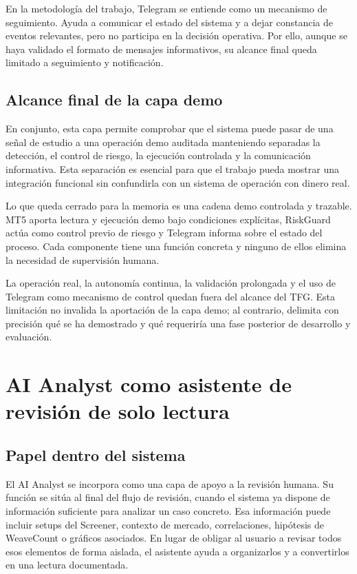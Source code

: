 En la metodolog\'ia del trabajo, Telegram se entiende como un mecanismo de
seguimiento. Ayuda a comunicar el estado del sistema y a dejar constancia de
eventos relevantes, pero no participa en la decisi\'on operativa. Por ello,
aunque se haya validado el formato de mensajes informativos, su alcance final
queda limitado a seguimiento y notificaci\'on.

\subsection{Alcance final de la capa demo}
\label{subsec:alcance-final-capa-demo}

En conjunto, esta capa permite comprobar que el sistema puede pasar de una
se\~nal de estudio a una operaci\'on demo auditada manteniendo separadas la
detecci\'on, el control de riesgo, la ejecuci\'on controlada y la comunicaci\'on
informativa. Esta separaci\'on es esencial para que el trabajo pueda mostrar una
integraci\'on funcional sin confundirla con un sistema de operaci\'on con dinero
real.

Lo que queda cerrado para la memoria es una cadena demo controlada y trazable.
MT5 aporta lectura y ejecuci\'on demo bajo condiciones expl\'icitas, RiskGuard
act\'ua como control previo de riesgo y Telegram informa sobre el estado del
proceso. Cada componente tiene una funci\'on concreta y ninguno de ellos elimina la
necesidad de supervisi\'on humana.

La operaci\'on real, la autonom\'ia continua, la validaci\'on prolongada y el uso
de Telegram como mecanismo de control quedan fuera del alcance del TFG. Esta
limitaci\'on no invalida la aportaci\'on de la capa demo; al contrario, delimita
con precisi\'on qu\'e se ha demostrado y qu\'e requerir\'ia una fase posterior de
desarrollo y evaluaci\'on.

\section{AI Analyst como asistente de revisi\'on de solo lectura}
\label{sec:ai-analyst-read-only}

\subsection{Papel dentro del sistema}
\label{subsec:ai-analyst-papel-sistema}

El AI Analyst se incorpora como una capa de apoyo a la revisi\'on humana. Su
funci\'on se sit\'ua al final del flujo de revisi\'on, cuando el sistema ya dispone
de informaci\'on suficiente para analizar un caso concreto. Esa informaci\'on puede incluir
setups del Screener, contexto de mercado, correlaciones, hip\'otesis de
WeaveCount o gr\'aficos asociados. En lugar de
obligar al usuario a revisar todos esos elementos de forma aislada, el asistente
ayuda a organizarlos y a convertirlos en una lectura documentada.

